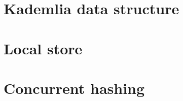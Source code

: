 
\section{Kademlia data structure}    
                        
\section{Local store}

\section{Concurrent hashing}
